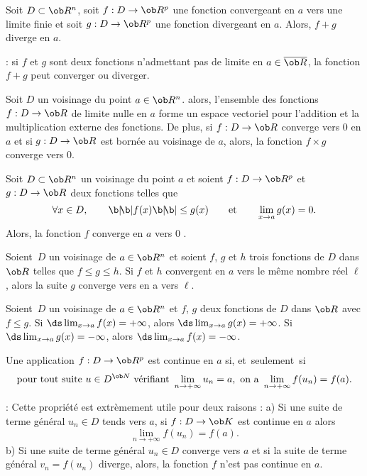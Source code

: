 \Propriete []  Soit $D\subset\ob R^n$, soit $f:D\to\ob R^p$ une fonction convergeant en $a$ vers une limite finie et soit $g:D\to\ob R^p$ une fonction divergeant en $a$. Alors, $f+g$ diverge en $a$. 
\bigskip

\Remarque : si $f$ et $g$ sont deux fonctions n'admettant pas de limite en $a\in\overline{\ob R}$, la fonction $f+g$ peut converger ou diverger. 
\bigskip

\Propriete []  Soit $D$ un voisinage du point $a\in\ob R^n$. alors, 
l'ensemble des fonctions $f:D\to\ob R$ de limite nulle en $a$ forme un espace vectoriel pour l'addition et la multiplication externe des fonctions. 
De plus, si $f:D\to\ob R$ converge vers $0$ en $a$ et si $g:D\to\ob R$ est born\'ee au voisinage de $a$, alors, la fonction $f\times g$ converge vers $0$. 

 
\Propriete []  Soit $D\subset\ob R^n$ un voisinage du point $a$ et soient $f:D\to\ob R^p$ et $g:D\to\ob R$ deux fonctions telles que 
$$
\forall x\in D, \qquad \b|\!\b|f(x)\b|\!\b|\le g(x)\qquad \mbox{et}\qquad \lim_{x\to a}g(x)=0.
$$
Alors, la fonction $f$ converge en $a$ vers $0$ . 

\Propriete [Title=Principe des gendarmes]
Soient~$D$ un voisinage de $a\in\ob R^n$ et soient $f$, $g$ et $h$ trois fonctions de $D$ dans $\ob R$ telles que $f\le g\le h$. Si $f$ et $h$ convergent en $a$ vers le m\^eme nombre r\'eel $\ell$, alors la suite $g$ converge vers en a vers $\ell$. 


\Propriete [Title=Conservation des in\'egalit\'es larges par passage \`a la limite]
Soient~$D$ un voisinage de $a\in\ob R^n$ 
et $f$, $g$ deux fonctions de $D$ dans $\ob R$ avec $f\le g$. \pn 
Si $\ds\lim_{x\to a}f(x)=+\infty$, alors $\ds\lim_{x\to a}g(x)=+\infty$. 
\pn
Si $\ds\lim_{x\to a}g(x)=-\infty$, alors $\ds\lim_{x\to a}f(x)=-\infty$. 
 
\Theoreme [$D$ voisinage de $a\in\ob R^n$]
Une application $f:D\to\ob R^p$ est continue en $a$ si, et~seulement~si 
$$
\mbox{pour tout suite }u\in D^{\ob N} \mbox{ v\'erifiant }\lim_{n\to+\infty}u_n=a, \mbox{ on a }\lim_{n\to+\infty}f(u_n)=f(a). 
$$

\Remarque : Cette propri\'et\'e est extr\`emement utile pour deux raisons : \pn
a) Si une suite de terme g\'en\'eral $u_n\in D$ tends vers $a$, si $f:D\to\ob K$ est continue en $a$ 
alors 
$$
\lim_{n\to+\infty}f(u_n)=f(a).
$$
b) Si une suite de terme g\'en\'eral $u_n\in D$ converge vers $a$ et si la suite de terme g\'en\'eral $v_n=f(u_n)$ diverge, alors, la fonction $f$ n'est pas continue en $a$. 
\bigskip


